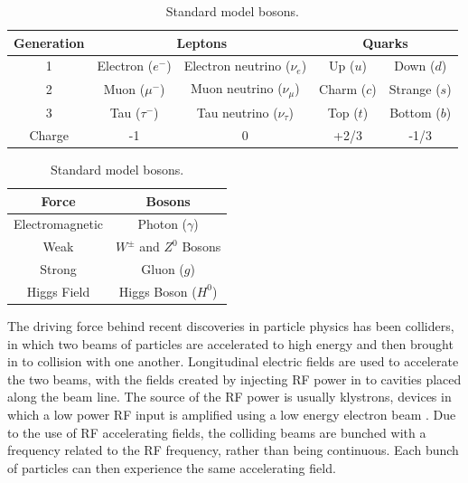 \begin{table}
  \begin{center}
    \begin{tabular}{|c | c c | c c|}
	   \hline
       Generation & \multicolumn{2}{c|}{Leptons} & \multicolumn{2}{c|}{Quarks} \\
       \hline
       1 & Electron (\(e^-\)) & Electron neutrino (\(\nu_e\)) & Up (\(u\)) & Down (\(d\)) \\
       2 & Muon (\(\mu^-\)) & Muon neutrino (\(\nu_\mu\)) & Charm (\(c\)) & Strange (\(s\)) \\
       3 & Tau (\(\tau^-\)) & Tau neutrino (\(\nu_\tau\)) & Top (\(t\)) & Bottom (\(b\)) \\
	   \hline
	   Charge & -1 & 0 & +2/3 & -1/3 \\
	   \hline
    \end{tabular}
    \caption{Standard model fermions.}
  	\label{t:fermions}
  	\vspace{0.5 cm}
  	\begin{tabular}{| c c |}
	   \hline
       Force & Bosons \\
       \hline
       Electromagnetic & Photon (\(\gamma\)) \\
       Weak & \(W^{\pm}\) and \(Z^0\) Bosons \\
       Strong & Gluon (\(g\)) \\
	   \hline
	   Higgs Field & Higgs Boson (\(H^0\)) \\
	   \hline
    \end{tabular}
    \caption{Standard model bosons.}
  	\label{t:bosons}

  \end{center}
\end{table}


The driving force behind recent discoveries in particle physics has been colliders, in which two beams of particles are accelerated to high energy and then brought in to collision with one another. Longitudinal electric fields are used to accelerate the two beams, with the fields created by injecting RF power in to cavities placed along the beam line. The source of the RF power is usually klystrons, devices in which a low power RF input is amplified using a low energy electron beam \cite{klyst}. Due to the use of RF accelerating fields, the colliding beams are bunched with a frequency related to the RF frequency, rather than being continuous. Each bunch of particles can then experience the same accelerating field.

